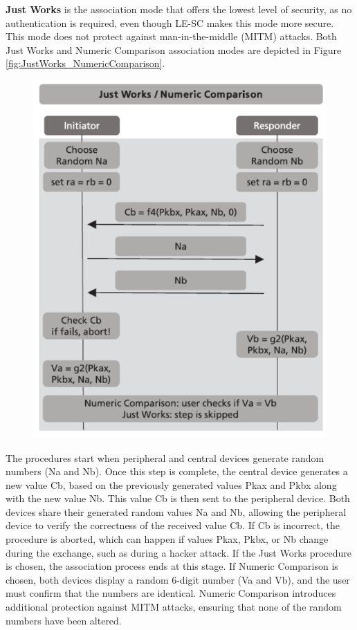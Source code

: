 \documentclass{Configuration_Files/PoliMi3i_thesis}
\begin{document}
\textbf{Just Works} is the association mode that offers the lowest level of security, as no authentication is required, even though LE-SC makes this mode more secure. This mode does not protect against man-in-the-middle (MITM) attacks. Both Just Works and Numeric Comparison association modes are depicted in Figure \ref{fig:JustWorks_NumericComparison}.

\begin{figure}[H]
    \centering
    \includegraphics[scale=0.7]{Bluetooth_Security/6.png}
    \label{fig:pairing_procedure}
\end{figure}

The procedures start when peripheral and central devices generate random numbers (Na and Nb). Once this step is complete, the central device generates a new value Cb, based on the previously generated values Pkax and Pkbx along with the new value Nb. This value Cb is then sent to the peripheral device. Both devices share their generated random values Na and Nb, allowing the peripheral device to verify the correctness of the received value Cb. If Cb is incorrect, the procedure is aborted, which can happen if values Pkax, Pkbx, or Nb change during the exchange, such as during a hacker attack. If the Just Works procedure is chosen, the association process ends at this stage. If Numeric Comparison is chosen, both devices display a random 6-digit number (Va and Vb), and the user must confirm that the numbers are identical. Numeric Comparison introduces additional protection against MITM attacks, ensuring that none of the random numbers have been altered.
\end{document}
